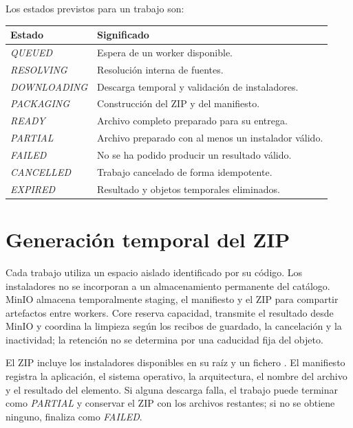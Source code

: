 Los estados previstos para un trabajo son:

\begin{center}
	\begin{tabularx}{0.92\textwidth}{p{}X}
		\toprule
		\textbf{Estado}    & \textbf{Significado}                                 \\
		\midrule
		\emph{QUEUED}      & Espera de un worker disponible.                      \\
		\emph{RESOLVING}   & Resolución interna de fuentes.                       \\
		\emph{DOWNLOADING} & Descarga temporal y validación de instaladores.      \\
		\emph{PACKAGING}   & Construcción del ZIP y del manifiesto.               \\
		\emph{READY}       & Archivo completo preparado para su entrega.          \\
		\emph{PARTIAL}     & Archivo preparado con al menos un instalador válido. \\
		\emph{FAILED}      & No se ha podido producir un resultado válido.        \\
		\emph{CANCELLED}   & Trabajo cancelado de forma idempotente.              \\
		\emph{EXPIRED}     & Resultado y objetos temporales eliminados.           \\
		\bottomrule
	\end{tabularx}
\end{center}

\section{Generación temporal del ZIP}

Cada trabajo utiliza un espacio aislado identificado por su código. Los instaladores no se incorporan a un almacenamiento permanente del catálogo. MinIO almacena temporalmente staging, el manifiesto y el ZIP para compartir artefactos entre workers. Core reserva capacidad, transmite el resultado desde MinIO y coordina la limpieza según los recibos de guardado, la cancelación y la inactividad; la retención no se determina por una caducidad fija del objeto.

El ZIP incluye los instaladores disponibles en su raíz y un fichero . El manifiesto registra la aplicación, el sistema operativo, la arquitectura, el nombre del archivo y el resultado del elemento. Si alguna descarga falla, el trabajo puede terminar como \emph{PARTIAL} y conservar el ZIP con los archivos restantes; si no se obtiene ninguno, finaliza como \emph{FAILED}.

